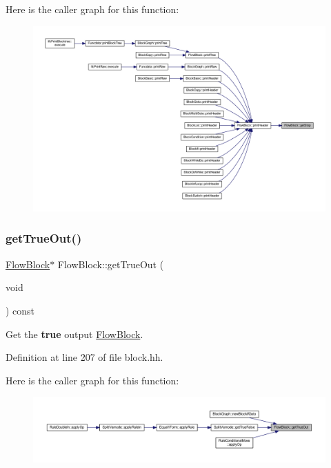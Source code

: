 Here is the caller graph for this function\+:
\nopagebreak
\begin{figure}[H]
\begin{center}
\leavevmode
\includegraphics[width=350pt]{class_flow_block_a5448927fcc62a519c92c8afcbf54e35f_icgraph}
\end{center}
\end{figure}
\mbox{\label{class_flow_block_aa4603393f63126506d0ea46e59b1b188}} 
\subsubsection{\texorpdfstring{getTrueOut()}{getTrueOut()}}
{\footnotesize\ttfamily \mbox{\hyperlink{class_flow_block}{Flow\+Block}}$\ast$ Flow\+Block\+::get\+True\+Out (\begin{DoxyParamCaption}\item[{void}]{ }\end{DoxyParamCaption}) const\hspace{0.3cm}{\ttfamily [inline]}}



Get the {\bfseries{true}} output \mbox{\hyperlink{class_flow_block}{Flow\+Block}}. 



Definition at line 207 of file block.\+hh.

Here is the caller graph for this function\+:
\nopagebreak
\begin{figure}[H]
\begin{center}
\leavevmode
\includegraphics[width=350pt]{class_flow_block_aa4603393f63126506d0ea46e59b1b188_icgraph}
\end{center}
\end{figure}
\mbox{\label{class_flow_block_ae036068cc610d97a5461f9bcf75bd43d}} 

